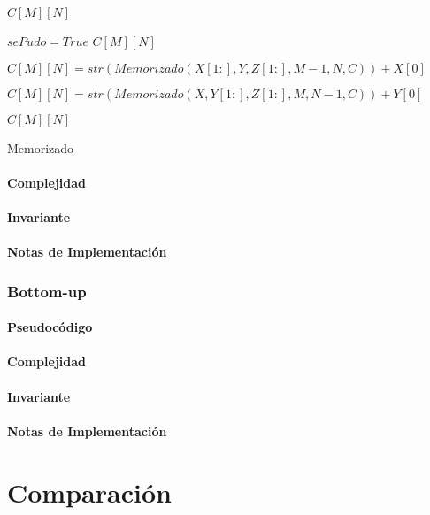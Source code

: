 \documentclass[]{article}
\numberwithin{equation}{section}
\numberwithin{figure}{section}
\theoremstyle{definition}
\begin{document}
	\begin{algorithm}[H]
	\begin{algorithmic}[1]
	
	
		\State\Return $C[M][N]$
	\EndIf
	
		\State $sePudo = True$
		\State\Return $C[M][N]$
	\EndIf
	
				\State $C[M][N] = str(Memorizado(X[1:],Y,Z[1:],M-1,N,C))+X[0]$
			\EndIf
		\EndIf
		
				\State $C[M][N] = str(Memorizado(X,Y[1:],Z[1:],M,N-1,C))+Y[0]$
			\EndIf
		\EndIf
	\EndIf
	
	\State\Return $C[M][N]$	
	
	\EndProcedure
	
	\end{algorithmic}
	\caption{\foreignlanguage{english}{Memorizado}}
	\end{algorithm}
	
	\subsection*{Complejidad}
	
	\subsection*{Invariante}
	
	\subsection*{Notas de Implementación}

\section*{Bottom-up}

	\subsection*{Pseudocódigo}
	
	\subsection*{Complejidad}
	
	\subsection*{Invariante}
	
	\subsection*{Notas de Implementación}

\part*{Comparación}
\end{document}
